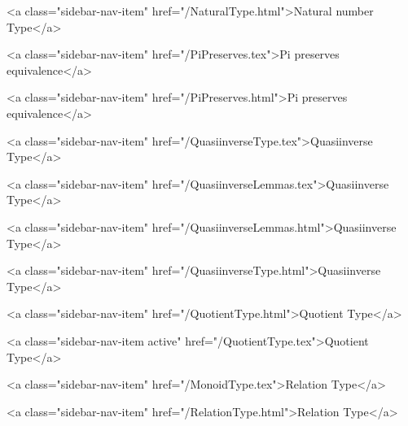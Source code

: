       
        
          <a class="sidebar-nav-item" href="/NaturalType.html">Natural number Type</a>
        
      
    
      
        
          <a class="sidebar-nav-item" href="/PiPreserves.tex">Pi preserves equivalence</a>
        
      
    
      
        
          <a class="sidebar-nav-item" href="/PiPreserves.html">Pi preserves equivalence</a>
        
      
    
      
        
          <a class="sidebar-nav-item" href="/QuasiinverseType.tex">Quasiinverse Type</a>
        
      
    
      
        
          <a class="sidebar-nav-item" href="/QuasiinverseLemmas.tex">Quasiinverse Type</a>
        
      
    
      
        
          <a class="sidebar-nav-item" href="/QuasiinverseLemmas.html">Quasiinverse Type</a>
        
      
    
      
        
          <a class="sidebar-nav-item" href="/QuasiinverseType.html">Quasiinverse Type</a>
        
      
    
      
        
          <a class="sidebar-nav-item" href="/QuotientType.html">Quotient Type</a>
        
      
    
      
        
          <a class="sidebar-nav-item active" href="/QuotientType.tex">Quotient Type</a>
        
      
    
      
        
          <a class="sidebar-nav-item" href="/MonoidType.tex">Relation Type</a>
        
      
    
      
        
          <a class="sidebar-nav-item" href="/RelationType.html">Relation Type</a>
        
